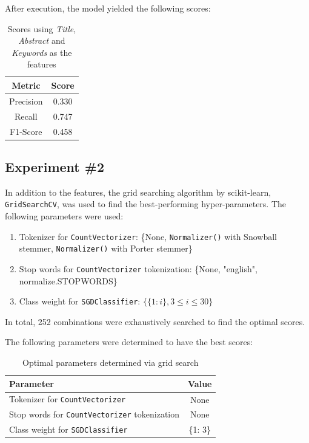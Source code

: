 \documentclass[11pt]{article}
\begin{document}
After execution, the model yielded the following scores:
\begin{table}[!ht]
    \caption{Scores using \textit{Title}, \textit{Abstract} and \textit{Keywords} as the features}
    \begin{center}

        \begin{tabular}{| c | c |}
        \hline
        \textbf{Metric} & \textbf{Score}
        \\ \hline
        Precision & 0.330 
        \\ \hline
        Recall & 0.747
        \\ \hline
        F1-Score & 0.458
        \\ \hline
        \end{tabular}

    \end{center}

\end{table}

\subsection*{Experiment \#2}
In addition to the features, the grid searching algorithm by scikit-learn, \texttt{GridSearchCV}, was used to find the best-performing hyper-parameters. The following parameters were used:
\begin{enumerate}
    \item Tokenizer for \texttt{CountVectorizer}: \{None, \texttt{Normalizer()} with Snowball stemmer, \texttt{Normalizer()} with Porter stemmer\}
    \item Stop words for \texttt{CountVectorizer} tokenization: \{None, "english", normalize.STOPWORDS\}
    \item Class weight for \texttt{SGDClassifier}: $\{\{1: i\}, 3 \le i \le 30\}$
\end{enumerate}
In total, 252 combinations were exhaustively searched to find the optimal scores.

The following parameters were determined to have the best scores:
\begin{table}[!ht]
    \caption{Optimal parameters determined via grid search}
    \begin{center}

        \begin{tabular}{| l | c |}
        \hline
        \textbf{Parameter} & \textbf{Value}
        \\ \hline
        Tokenizer for \texttt{CountVectorizer} & None
        \\ \hline
        Stop words for \texttt{CountVectorizer} tokenization & None
        \\ \hline
        Class weight for \texttt{SGDClassifier} & \{1: 3\}
        \\ \hline
        \end{tabular}

    \end{center}

\end{table}
\end{document}
